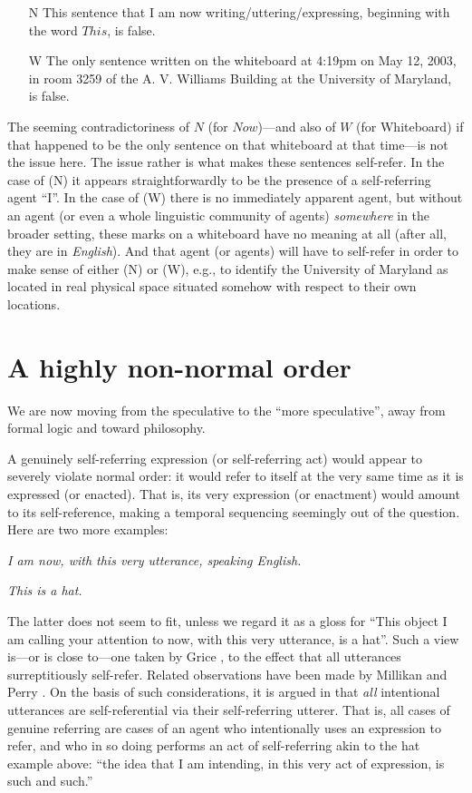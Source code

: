 \documentclass{amsart}
\begin{document}
\begin{enumerate}
\item[N]
This sentence that I am now writing/uttering/expressing, beginning
with the word $This$, is false.

\item[W]
The only sentence written on the whiteboard at 4:19pm on May 12, 2003, in
room 3259 of the A. V. Williams Building at the University of
Maryland, is false.
\end{enumerate}

The seeming contradictoriness of $N$ (for $Now$)---and also of $W$ (for
Whiteboard) if that 
happened to be the only sentence on that whiteboard at that time---is
not the issue here.  The issue rather is what makes these sentences
self-refer.  In the case of (N) it appears straightforwardly to be the
presence of a self-referring agent ``I''. In the case of (W) there is
no immediately apparent agent, but without an agent (or even a whole
linguistic community of agents) {\em somewhere} in the broader
setting, these marks on a whiteboard have no meaning at all (after
all, they are in {\em English}). And that agent (or agents) will have to
self-refer in order to make sense of either (N) or (W), e.g., to
identify the University of Maryland as located in real physical space
situated somehow with respect to their own locations.


\section{A highly non-normal order}

We are now moving from the speculative to the ``more speculative'',
away from formal logic and toward philosophy.

A genuinely self-referring expression (or self-referring act) would
appear to severely violate normal order: it would refer to itself at the very
same time as it is expressed (or enacted).  That is, its very expression
(or enactment) would amount to its self-reference, making a temporal
sequencing seemingly out of the question.  Here are two more examples:

\centerline{\em I am now, with this very utterance, speaking English.}
\centerline{\em This is a hat.}

The latter does not seem to fit, unless we regard it as a gloss for
``This object I am calling your 
attention to now, with this very utterance, is a hat''.  Such a view
is---or is close to---one taken by Grice \cite{grice:meaning}, to the effect
that all utterances surreptitiously self-refer. Related observations have
been made by Millikan \cite{millikan:pushmi} and Perry
\cite{perry:problem}. On the 
basis of such considerations, it is argued in
\cite{perlis:putting1,perlis:putting2,perlis97:consciousness} that 
{\em all} intentional utterances are self-referential via their
self-referring utterer. That is, all cases of genuine referring are
cases of an agent who intentionally uses an expression to refer, and
who in so doing performs an act of self-referring akin to the hat
example above: ``the idea that I am intending, in this very act of
expression, is such and such.'' 
\end{document}
